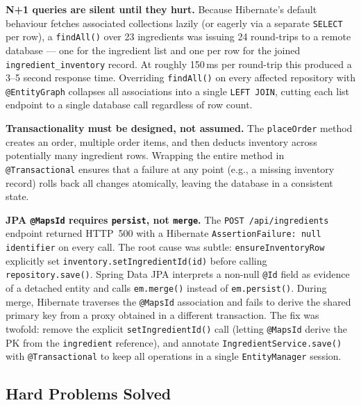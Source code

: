 \documentclass[12pt,a4paper]{article}
\begin{document}
\textbf{N+1 queries are silent until they hurt.}
Because Hibernate's default behaviour fetches associated collections lazily
(or eagerly via a separate \texttt{SELECT} per row), a \texttt{findAll()} over
23 ingredients was issuing 24 round-trips to a remote database --- one for the
ingredient list and one per row for the joined \texttt{ingredient\_inventory}
record. At roughly 150\,ms per round-trip this produced a 3--5 second response
time. Overriding \texttt{findAll()} on every affected repository with
\texttt{@EntityGraph} collapses all associations into a single \texttt{LEFT
JOIN}, cutting each list endpoint to a single database call regardless of row
count.

\textbf{Transactionality must be designed, not assumed.}
The \texttt{placeOrder} method creates an order, multiple order items, and then
deducts inventory across potentially many ingredient rows. Wrapping the entire
method in \texttt{@Transactional} ensures that a failure at any point (e.g., a
missing inventory record) rolls back all changes atomically, leaving the database
in a consistent state.

\textbf{JPA \texttt{@MapsId} requires \texttt{persist}, not \texttt{merge}.}
The \texttt{POST /api/ingredients} endpoint returned HTTP~500 with a Hibernate
\texttt{AssertionFailure: null identifier} on every call. The root cause was
subtle: \texttt{ensureInventoryRow} explicitly set \texttt{inventory.setIngredientId(id)}
before calling \texttt{repository.save()}. Spring Data JPA interprets a
non-null \texttt{@Id} field as evidence of a detached entity and calls
\texttt{em.merge()} instead of \texttt{em.persist()}. During merge, Hibernate
traverses the \texttt{@MapsId} association and fails to derive the shared
primary key from a proxy obtained in a different transaction. The fix was
twofold: remove the explicit \texttt{setIngredientId()} call (letting
\texttt{@MapsId} derive the PK from the \texttt{ingredient} reference), and
annotate \texttt{IngredientService.save()} with \texttt{@Transactional} to
keep all operations in a single \texttt{EntityManager} session.

\subsection{Hard Problems Solved}
\end{document}
